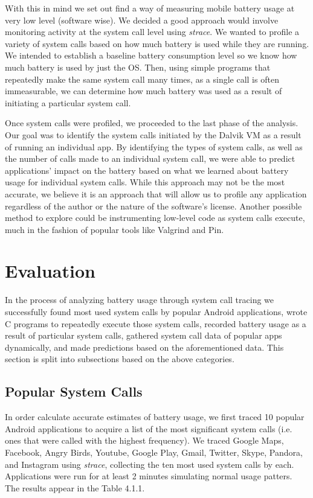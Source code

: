 \documentclass[11pt]{article}
\begin{document}
With this in mind we set out find a way of measuring mobile battery usage at very low level
(software wise). We decided a good approach would involve monitoring activity at the system 
call level using \textit{strace}. We wanted to profile a variety of system calls 
based on how much battery is used while they are running. We intended to establish a baseline 
battery consumption level so we know how much battery is used by just the OS. Then, using 
simple programs that repeatedly make the same system call many times, as a single call is often
immeasurable, we can determine how much battery was used as a result of initiating a particular system call.  

Once system calls were profiled, we proceeded to the last phase of the analysis. Our 
goal was to identify the system calls initiated by the Dalvik VM as a result of running an 
individual app. By identifying the types of system calls, as well as the number of calls made 
to an individual system call, we were able to predict applications' impact on the battery based 
on what we learned about battery usage for individual system calls. While this approach may not 
be the most accurate, we believe it is an approach that will allow us to profile any 
application regardless of the author or the nature of the software's license.  Another possible method
to explore could be instrumenting low-level code as system calls execute, much in the fashion of popular
tools like Valgrind and Pin.

\section{Evaluation}

In the process of analyzing battery usage through system call tracing we successfully
found most used system calls by popular Android applications, wrote C programs to 
repeatedly execute those system calls, recorded battery usage as a result of particular 
system calls, gathered system call data of popular apps dynamically, and made predictions 
based on the aforementioned data.  This section is split into subsections based on the above
categories.

\subsection{Popular System Calls}

In order calculate accurate estimates of battery usage, we first traced 10 popular Android
applications to acquire a list of the most significant system calls (i.e. ones that were
called with the highest frequency).  We traced Google Maps, Facebook, Angry Birds, Youtube, Google Play,
Gmail, Twitter, Skype, Pandora, and Instagram using \textit{strace}, collecting the ten most 
used system calls by each.  Applications were run for at least 2 minutes simulating normal 
usage patters. The results appear in the Table 4.1.1.
\end{document}
